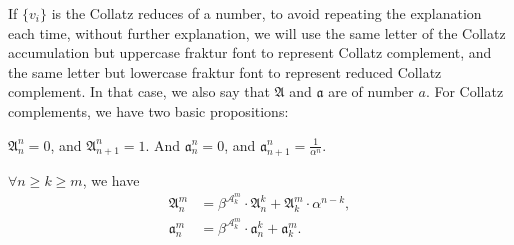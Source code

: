 If $\{v_{i}\}$ is the Collatz reduces of a number, to avoid repeating the explanation each time, without further explanation, we will use the same letter of the Collatz accumulation but uppercase fraktur font to represent Collatz complement, and the same letter but lowercase fraktur font to represent reduced Collatz complement.
In that case, we also say that $\mathfrak{A}$ and $\mathfrak{a}$ are of number $a$.
For Collatz complements, we have two basic propositions:
\begin{proposition}\label{proposition:collatz-complement-basic-prop1}
$\mathfrak{A}_{n}^{n} = 0$, and $\mathfrak{A}_{n+1}^{n} = 1$.
And $\mathfrak{a}_{n}^{n} = 0$, and $\mathfrak{a}_{n+1}^{n} = \frac{1}{\alpha^{n}}$.
\end{proposition}
\begin{proposition}\label{proposition:collatz-complement-basic-prop2}
    $\forall n \ge k \ge m$, we have
    \begin{align*}
        \mathfrak{A}_n^{m} &= \beta^{\mathcal{A}_k^{m}}\cdot\mathfrak{A}_n^{k} + \mathfrak{A}_k^m\cdot\alpha^{n-k}, \\
        \mathfrak{a}_n^{m} &= \beta^{\mathcal{A}_k^{m}}\cdot\mathfrak{a}_n^{k} + \mathfrak{a}_k^m. 
    \end{align*}
\end{proposition}
